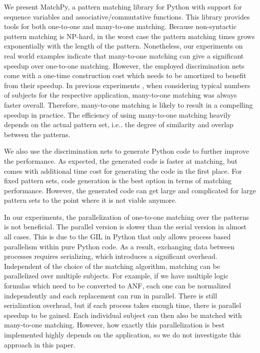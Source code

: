 \documentclass[conference,compsoc]{IEEEtran}
\makeatletter
\DeclareRobustCommand\onedot{\futurelet\@let@token\@onedot}
\def\@onedot{\ifx\@let@token.\else.\null\fi\xspace}
\def\ie{{i.e}\onedot} \def\Ie{{I.e}\onedot}
\makeatother
\begin{document}
We present MatchPy, a pattern matching library for Python with support for sequence variables and associative/commutative functions.
This library provides tools for both one-to-one and many-to-one matching.
Because non-syntactic pattern matching is NP-hard, in the worst case the pattern matching times grows exponentially with the length of the pattern.
Nonetheless, our experiments on real world examples indicate that many-to-one matching can give a significant speedup over one-to-one matching.
However, the employed discrimination nets come with a one-time construction cost which needs to be amortized to benefit from their speedup.
In previous experiments \cite{Krebber2017,thesis}, when considering typical numbers of subjects for the respective application, many-to-one matching was always faster overall.
Therefore, many-to-one matching is likely to result in a compelling speedup in practice.
The efficiency of using many-to-one matching heavily depends on the actual pattern set, \ie the degree of similarity and overlap between the patterns.

We also use the discrimination nets to generate Python code to further improve the performance.
As expected, the generated code is faster at matching, but comes with additional time cost for generating the code in the first place.
For fixed pattern sets, code generation is the best option in terms of matching performance.
However, the generated code can get large and complicated for large pattern sets to the point where it is not viable anymore.

In our experiments, the parallelization of one-to-one matching over the patterns is not beneficial.
The parallel version is slower than the serial version in almost all cases.
This is due to the GIL in Python that only allows process based parallelism within pure Python code.
As a result, exchanging data between processes requires serializing, which introduces a significant overhead.
Independent of the choice of the matching algorithm, matching can be parallelized over multiple subjects.
For example, if we have multiple logic formulas which need to be converted to ANF, each one can be normalized independently and each replacement can run in parallel.
There is still serialization overhead, but if each process takes enough time, there is parallel speedup to be gained.
Each individual subject can then also be matched with many-to-one matching.
However, how exactly this parallelization is best implemented highly depends on the application, so we do not investigate this approach in this paper.
\end{document}
